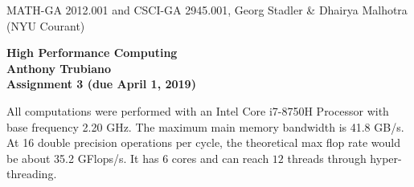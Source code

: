 \documentclass[11pt]{article}
\begin{document}
\begin{center}
  \vspace*{-2cm}
{\small MATH-GA 2012.001 and CSCI-GA 2945.001, Georg Stadler \&
  Dhairya Malhotra (NYU Courant)}
\end{center}
\vspace*{.5cm}
\begin{center}
\large \textbf{%
High Performance Computing \\
Anthony Trubiano \\
Assignment 3 (due April 1, 2019) }
\end{center}


 All computations were performed with an Intel Core i7-8750H Processor with base frequency 2.20 GHz. The maximum main memory bandwidth is 41.8 GB/s. At 16 double 
precision operations per cycle, the theoretical max flop rate would be about 35.2 GFlops/s. It has $6$ cores and can reach $12$ threads through hyper-threading. 
\end{document}
